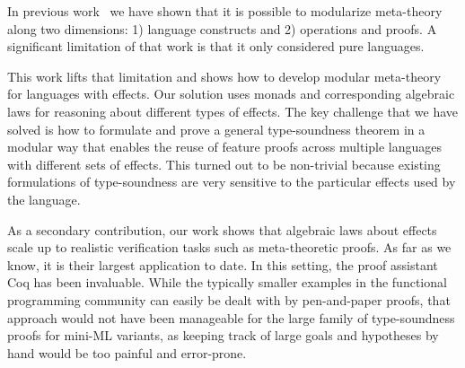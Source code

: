 In previous work~\cite{mtc} we have shown that it is possible to
modularize meta-theory along two dimensions: 1) language constructs and
2) operations and proofs. A significant limitation of that work is
that it only considered pure languages.

This work lifts that limitation and shows how to develop modular meta-theory for
languages with effects. Our solution uses monads and corresponding
algebraic laws for reasoning about different types of effects. The key
challenge that we have solved is how to formulate and prove a general
type-soundness theorem in a modular way that enables the reuse of feature
proofs across multiple languages with different sets of effects.  This turned
out to be non-trivial because existing formulations of type-soundness are very
sensitive to the particular effects used by the language.

As a secondary contribution, our work shows that algebraic laws about effects
scale up to realistic verification tasks such as meta-theoretic proofs. As far
as we know, it is their largest application to date. In this setting, the proof
assistant Coq has been invaluable. While the typically smaller examples in the
functional programming community can easily be dealt with by pen-and-paper
proofs, that approach would not have been manageable for the large family of
type-soundness proofs for mini-ML variants, as keeping track of large goals and
hypotheses by hand would be too painful and error-prone.


